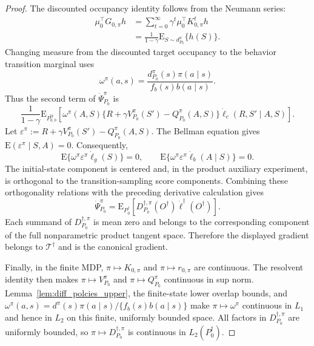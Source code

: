 \documentclass[10pt,a4paper]{amsart}
\newcommand{\E}{\mathrm{E}}
\begin{document}
\begin{proof}
    The discounted occupancy identity follows from the Neumann
    series:
    \[
        \begin{aligned}
        \mu_0^\top G_{0,\pi}h
        &=\sum_{t=0}^{\infty}\gamma^t
          \mu_0^\top K_{0,\pi}^t h\\
        &=\frac1{1-\gamma}
          \E_{S\sim d_{P_0}^\pi}\{h(S)\}.
        \end{aligned}
    \]
    Changing measure from the discounted target occupancy to the
    behavior transition marginal uses
    \[
        \omega^\pi(a,s)
        =\frac{d_{P_0}^\pi(s)\pi(a\mid s)}
        {f_b(s)b(a\mid s)}.
    \]
    Thus the second term of $\dot\Psi_{P_0}^\pi$ is
    \[
        \frac1{1-\gamma}
        \E_{P_{0,b}^{\mathrm{tr}}}\!\left[
        \omega^\pi(A,S)
        \{R+\gamma V_{P_0}^\pi(S')
        -Q_{P_0}^\pi(A,S)\}
        \dot\ell_c(R,S'\mid A,S)\right].
    \]
    Let
    $\varepsilon^\pi
      :=R+\gamma V_{P_0}^\pi(S')-Q_{P_0}^\pi(A,S)$.
    The Bellman equation gives
    $\E(\varepsilon^\pi\mid S,A)=0$.  Consequently,
    \[
        \E\{\omega^\pi\varepsilon^\pi\dot\ell_g(S)\}=0,
        \qquad
        \E\{\omega^\pi\varepsilon^\pi
        \dot\ell_b(A\mid S)\}=0.
    \]
    The initial-state component is centered and, in the product
    auxiliary experiment, is orthogonal to the transition-sampling
    score components.  Combining these orthogonality relations with
    the preceding derivative calculation gives
    \[
        \dot\Psi_{P_0}^{\pi}
        =\E_{P_0^\dagger}\!\left[
        D_{P_0}^{\dagger,\pi}(O^\dagger)
        \dot\ell^\dagger(O^\dagger)\right].
    \]
    Each summand of $D_{P_0}^{\dagger,\pi}$ is mean zero and belongs
    to the corresponding component of the full nonparametric product
    tangent space.  Therefore the displayed gradient belongs to
    $\mathcal T^\dagger$ and is the canonical gradient.

    Finally, in the finite MDP,
    $\pi\mapsto K_{0,\pi}$ and $\pi\mapsto r_{0,\pi}$ are continuous.
    The resolvent identity then makes
    $\pi\mapsto V_{P_0}^\pi$ and
    $\pi\mapsto Q_{P_0}^\pi$ continuous in sup norm.
    Lemma~\ref{lem:diff_polcies_upper}, the finite-state lower overlap
    bounds, and
    $\omega^\pi(a,s)
      =d^\pi(s)\pi(a\mid s)/\{f_b(s)b(a\mid s)\}$ make
    $\pi\mapsto\omega^\pi$ continuous in $L_1$ and hence in $L_2$
    on this finite, uniformly bounded space.  All factors in
    $D_{P_0}^{\dagger,\pi}$ are uniformly bounded, so
    $\pi\mapsto D_{P_0}^{\dagger,\pi}$ is continuous in
    $L_2(P_0^\dagger)$.
\end{proof}
\end{document}
